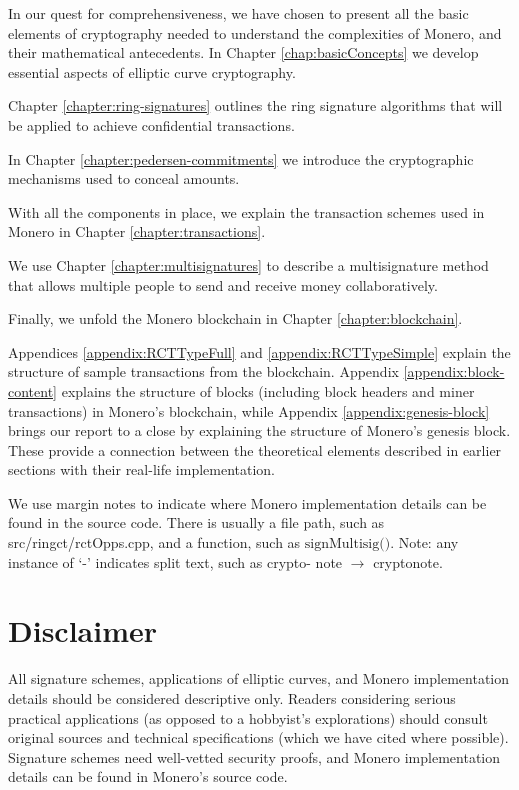 In our quest for comprehensiveness, we have chosen to present all the basic elements of cryptography needed to understand the complexities of Monero, and their mathematical antecedents. In Chapter \ref{chap:basicConcepts} we develop essential aspects of elliptic curve cryptography.

Chapter \ref{chapter:ring-signatures} outlines the ring signature algorithms that will be applied to achieve confidential transactions.

In Chapter \ref{chapter:pedersen-commitments} we introduce the cryptographic mechanisms used to conceal amounts.

With all the components in place, we explain the transaction schemes used in Monero in Chapter \ref{chapter:transactions}.

We use Chapter \ref{chapter:multisignatures} to describe a multisignature method that allows multiple people to send and receive money collaboratively. %

Finally, we unfold the Monero blockchain in Chapter \ref{chapter:blockchain}.

Appendices \ref{appendix:RCTTypeFull} and \ref{appendix:RCTTypeSimple} explain the structure of sample transactions from the blockchain. Appendix \ref{appendix:block-content} explains the structure of blocks (including block headers and miner transactions) in Monero's blockchain, while Appendix \ref{appendix:genesis-block} brings our report to a close by explaining the structure of Monero's genesis block. These provide a connection between the theoretical elements described in earlier sections with their real-life implementation.

We use margin notes to indicate where Monero implementation details can be found in the source code. There is usually a file path, such as src/ringct/rctOpps.cpp, and a function, such as \(\textrm{signMultisig()}\). Note: any instance of `-' indicates split text, such as crypto- note $\rightarrow$ cryptonote.

\section{Disclaimer}

All signature schemes, applications of elliptic curves, and Monero implementation details should be considered descriptive only. Readers considering serious practical applications (as opposed to a hobbyist's explorations) should consult original sources and technical specifications (which we have cited where possible). Signature schemes need well-vetted security proofs, and Monero implementation details can be found in Monero's source code.